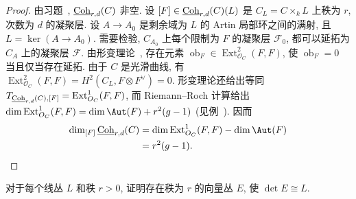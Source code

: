 \begin{proof}
由习题~, $\underline{\mathrm{Coh}}_{r,d}(C)$ 非空. 设 $[F]\in\underline{\mathrm{Coh}}_{r,d}(C)(L)$ 是 $C_L=C\times_k L$ 上秩为 $r$, 次数为 $d$ 的凝聚层. 设 $A\to A_0$ 是剩余域为 $L$ 的 Artin 局部环之间的满射, 且 $L=\ker(A\to A_0)$. 需要检验, $C_{A_0}$ 上每个限制为 $F$ 的凝聚层 $\mathcal F_0$, 都可以延拓为 $C_A$ 上的凝聚层 $\mathcal F$. 由形变理论~, 存在元素 $\operatorname{ob}_F\in\operatorname{Ext}^2_{\mathcal O_C}(F,F)$, 使 $\operatorname{ob}_F=0$ 当且仅当存在延拓. 由于 $C$ 是光滑曲线, 有 $\operatorname{Ext}^2_{\mathcal O_C}(F,F)=H^2(C_L,F\otimes F^\vee)=0$. 形变理论还给出等同 $T_{\underline{\mathrm{Coh}}_{r,d}(C),[F]}=\operatorname{Ext}^1_{O_C}(F,F)$, 而 Riemann--Roch 计算给出 $\dim\operatorname{Ext}^1_{\mathcal O_C}(F,F)=\dim\Aut(F)+r^2(g-1)$ (见例~). 因而
\[
\begin{aligned}
\dim_{[F]}\Coh_{r,d}(C)&=\dim\operatorname{Ext}^1_{\mathcal O_C}(F,F)-\dim\Aut(F)\\
&=r^2(g-1).
\end{aligned}
\]
\end{proof}
\begin{exercise}\label{src:4.7.10}
对于每个线丛 $L$ 和秩 $r>0$, 证明存在秩为 $r$ 的向量丛 $E$, 使 $\det E\cong L$.
\end{exercise}
